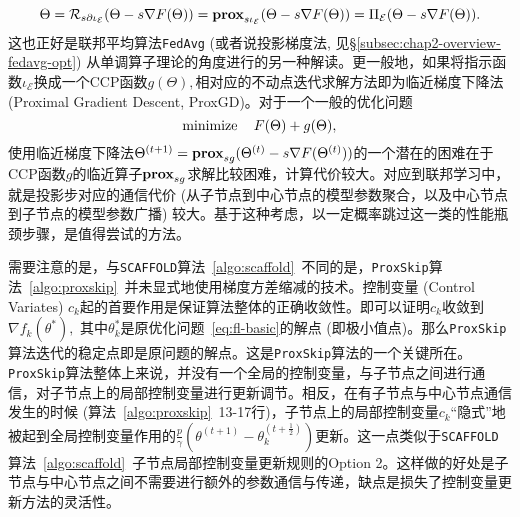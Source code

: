 \begin{equation*}
\Theta = \mathcal{R}_{s\partial\iota_{\mathcal{E}}}(\Theta - s\nabla F(\Theta)) = \mathbf{prox}_{s\iota_{\mathcal{E}}}(\Theta - s\nabla F(\Theta)) = \Pi_{\mathcal{E}}(\Theta - s\nabla F(\Theta)).
\end{equation*}
这也正好是联邦平均算法\texttt{FedAvg} (或者说投影梯度法, 见\S\ref{subsec:chap2-overview-fedavg-opt}) 从单调算子理论的角度进行的另一种解读。更一般地，如果将指示函数$\iota_{\mathcal{E}}$换成一个CCP函数$g(\Theta),$相对应的不动点迭代求解方法即为临近梯度下降法 (Proximal Gradient Descent, ProxGD)。对于一个一般的优化问题
\begin{equation*}
\operatorname*{minimize} \quad F(\Theta) + g(\Theta),
\end{equation*}
使用临近梯度下降法$\Theta^{(t+1)} = \mathbf{prox}_{sg}(\Theta^{(t)} - s\nabla F(\Theta^{(t)}))$的一个潜在的困难在于CCP函数$g$的临近算子$\mathbf{prox}_{sg}$求解比较困难，计算代价较大\cite{friedlander2017efficient}。对应到联邦学习中，就是投影步对应的通信代价 (从子节点到中心节点的模型参数聚合，以及中心节点到子节点的模型参数广播) 较大。基于这种考虑，以一定概率跳过这一类的性能瓶颈步骤，是值得尝试的方法。

需要注意的是，与\texttt{SCAFFOLD}算法~\ref{algo:scaffold}~不同的是，\texttt{ProxSkip}算法~\ref{algo:proxskip}~并未显式地使用梯度方差缩减的技术。控制变量 (Control Variates) $c_k$起的首要作用是保证算法整体的正确收敛性。即可以证明$c_k$收敛到$\nabla f_k(\theta^*),$ 其中$\theta_k^*$是原优化问题~\ref{eq:fl-basic}的解点 (即极小值点)。那么\texttt{ProxSkip}算法迭代的稳定点即是原问题的解点。这是\texttt{ProxSkip}算法的一个关键所在。\texttt{ProxSkip}算法整体上来说，并没有一个全局的控制变量，与子节点之间进行通信，对子节点上的局部控制变量进行更新调节。相反，在有子节点与中心节点通信发生的时候 (算法~\ref{algo:proxskip}~13-17行)，子节点上的局部控制变量$c_k$``隐式''地被起到全局控制变量作用的$\frac{p}{\gamma}(\theta^{(t+1)} - \theta^{(t+\frac{1}{2})}_{k})$更新。这一点类似于\texttt{SCAFFOLD}算法~\ref{algo:scaffold}~子节点局部控制变量更新规则的Option 2。这样做的好处是子节点与中心节点之间不需要进行额外的参数通信与传递，缺点是损失了控制变量更新方法的灵活性。

